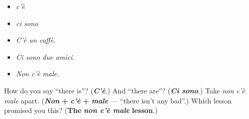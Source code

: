 \begin{itemize}
\raggedright
  \item \emph{c'è}
  \item \emph{ci sono}
  \item \emph{C'è un caffè.}
  \item \emph{Ci sono due amici.}
  \item \emph{Non c'è male.}
\end{itemize}

\begin{tcolorbox}[breakable,colback=teal!4,colframe=teal!35!black,title={Before you move on}]
How do you say \textquotedblleft{}there is\textquotedblright{}? (\emph{\textbf{C'è}}.) And \textquotedblleft{}there are\textquotedblright{}? (\emph{\textbf{Ci sono}}.) Take \emph{non c'è male} apart. (\emph{\textbf{Non}} \textbf{+} \emph{\textbf{c'è}} \textbf{+} \emph{\textbf{male}} — \textquotedblleft{}there isn't any bad\textquotedblright{}.) Which lesson promised you this? (\textbf{The} \emph{\textbf{non c'è male}} \textbf{lesson}.)
\end{tcolorbox}
